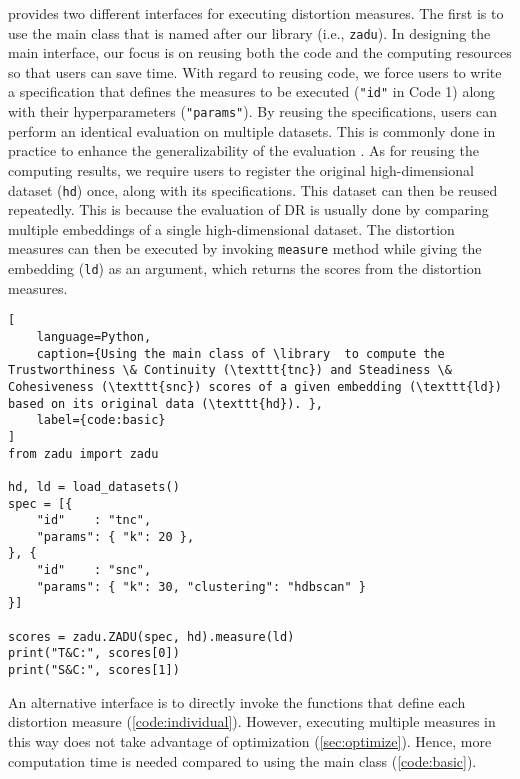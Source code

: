 \library provides two different interfaces for executing distortion measures. The first is to use the main class that is named after our library (i.e., \texttt{zadu}).
In designing the main interface, our focus is on reusing both the code and the computing resources so that users can save time.
With regard to reusing code, we force users to write a specification that defines the measures to be executed (\texttt{"id"} in Code 1) along with their hyperparameters (\texttt{"params"}). By reusing the specifications, users can perform an identical evaluation on multiple datasets. This is commonly done in practice to enhance the generalizability of the evaluation \cite{jeon22vis, espadoto21tvcg, moor20icml}.
As for reusing the computing results, we require users to register the original high-dimensional dataset (\texttt{hd}) once, along with its specifications. This dataset can then be reused repeatedly.
This is because the evaluation of DR is usually done by comparing multiple embeddings of a single high-dimensional dataset. 
The distortion measures can then be executed by invoking \texttt{measure} method while giving the embedding (\texttt{ld}) as an argument, which returns the scores from the distortion measures. 

\begin{lstlisting}[
    language=Python, 
    caption={Using the main class of \library  to compute the Trustworthiness \& Continuity (\texttt{tnc}) and Steadiness \& Cohesiveness (\texttt{snc}) scores of a given embedding (\texttt{ld}) based on its original data (\texttt{hd}). },
    label={code:basic}
]
from zadu import zadu

hd, ld = load_datasets()
spec = [{
    "id"    : "tnc",
    "params": { "k": 20 },
}, {
    "id"    : "snc",
    "params": { "k": 30, "clustering": "hdbscan" }
}]

scores = zadu.ZADU(spec, hd).measure(ld)
print("T&C:", scores[0])
print("S&C:", scores[1])

\end{lstlisting}



An alternative interface is to directly invoke the functions that define each distortion measure (\autoref{code:individual}).
However, executing multiple measures in this way does not take advantage of optimization (\autoref{sec:optimize}). Hence, more computation time is needed compared to using the main class (\autoref{code:basic}).

